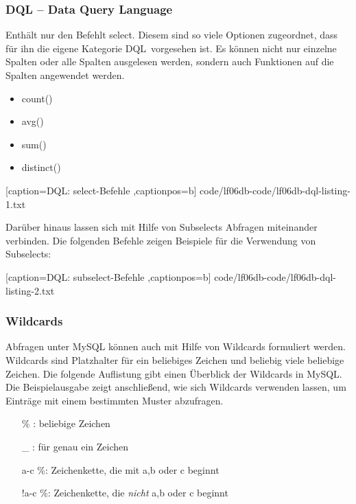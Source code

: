 \subsubsection{DQL -- Data Query Language}
Enthält nur den Befehlt \ql select\qr. Diesem sind so viele Optionen zugeordnet, dass für ihn die eigene Kategorie \ql DQL\qr\ vorgesehen ist. Es können nicht nur einzelne Spalten oder alle Spalten ausgelesen werden, sondern auch Funktionen auf die Spalten angewendet werden.

\begin{itemize}
	\item count()
	\item avg()
	\item sum()
	\item distinct()
\end{itemize}


	[caption={DQL: select-Befehle}
	\label{lst:dql-select},captionpos=b]
	{code/lf06db-code/lf06db-dql-listing-1.txt}

Darüber hinaus lassen sich mit Hilfe von Subselects Abfragen miteinander verbinden. Die folgenden Befehle zeigen Beispiele für die Verwendung von Subselects:


	[caption={DQL: subselect-Befehle}
	\label{lst:dql-subselect},captionpos=b]
	{code/lf06db-code/lf06db-dql-listing-2.txt}

\subsubsection{Wildcards}

Abfragen unter MySQL können auch mit Hilfe von Wildcards formuliert werden. Wildcards sind Platzhalter für ein beliebiges Zeichen und beliebig viele beliebige Zeichen. Die folgende Auflistung gibt einen Überblick der Wildcards in MySQL. Die Beispielausgabe zeigt anschließend, wie sich Wildcards verwenden lassen, um Einträge mit einem bestimmten Muster abzufragen.

\begin{itemize}
	\item [\%]: beliebige Zeichen
	\item [\_]: für genau ein Zeichen
	\item [a-c]\%: Zeichenkette, die mit a,b oder c beginnt  
	\item [!a-c]\%: Zeichenkette, die \emph{nicht} a,b oder c beginnt
\end{itemize}

